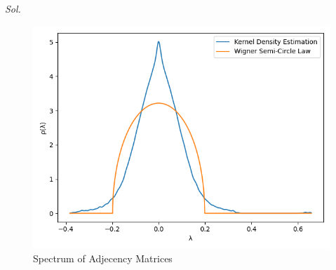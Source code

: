\begin{enumerate}
    \textit{ Sol. }
    
    \begin{figure}[htbp]
        \centering
        \includegraphics[width=14cm]{./Programming/spectrum.png}
        \caption{Spectrum of Adjecency Matrices}
        \label{fig7}
    \end{figure}
\end{enumerate}
